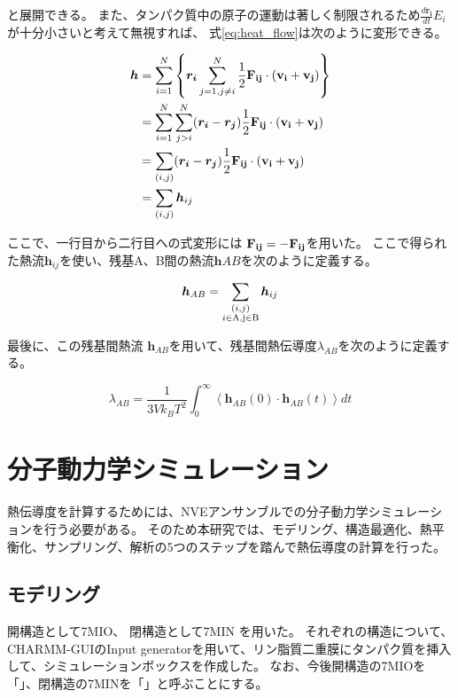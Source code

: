 と展開できる\autocite{leitner_mapping_2018}。
また、タンパク質中の原子の運動は著しく制限されるため$\frac{d\bm{r_i}}{dt}E_{i}$が十分小さいと考えて無視すれば、
式\ref{eq:heat_flow}は次のように変形できる。\autocite{yamatoComputationalStudyThermal2022,oai:nagoya.repo.nii.ac.jp:02007698}

\begin{align}
  \bm{h} &= \sum_{i=1}^{N} \left\{
              \bm{r_i}\sum_{j=1, j \neq i }^{N} \frac{1}{2} \bf{F}_{ij} \cdot (\bf{v}_i + \bf{v}_j)
            \right\} \\
         &= \sum_{i=1}^{N} \sum_{j>i}^{N}
              (\bm{r_i} - \bm{r_j}) \frac{1}{2} \bf{F}_{ij} \cdot (\bf{v}_i + \bf{v}_j) \\
         &= \sum_{(i, j)}
              (\bm{r_i} - \bm{r_j}) \frac{1}{2} \bf{F}_{ij} \cdot (\bf{v}_i + \bf{v}_j) \\
         &= \sum_{(i, j)}
              \bm{h}_{ij}
\end{align}

ここで、一行目から二行目への式変形には $\bf{F}_{ij} = - \bf{F}_{ij}$を用いた。
ここで得られた熱流$\bm{h}_{ij}$を使い、残基A、B間の熱流$\bm{h}{AB}$を次のように定義する。

\begin{equation}
  \label{eq:heat_flow_between_residues}
  \bm{h}_{AB} = \sum_{\substack{(i, j) \\ i \in \rm{A}, j \in \rm{B}}} \bm{h}_{ij}
\end{equation}

最後に、この残基間熱流 $\bm{h}_{AB}$を用いて、残基間熱伝導度$\lambda_{AB}$を次のように定義する。

\begin{equation}
  \label{eq:thermal_conductivity_between_residues}
  \lambda_{AB} = \frac{1}{3Vk_B T^2} \int_{0}^{\infty} \left\langle
    \bm{h}_{AB}(0) \cdot \bm{h}_{AB}(t)
  \right\rangle dt
\end{equation}

\section{分子動力学シミュレーション}

熱伝導度を計算するためには、NVEアンサンブルでの分子動力学シミュレーションを行う必要がある。
そのため本研究では、モデリング、構造最適化、熱平衡化、サンプリング、解析の5つのステップを踏んで熱伝導度の計算を行った。

\subsection{モデリング}
開構造として7MIO、%
閉構造として7MIN  %
を用いた。\autocite{noauthor_7mio_nodate, noauthor_7min_nodate, nadezhdinStructuralMechanismHeatinduced2021}
それぞれの構造について、CHARMM-GUIのInput generator\autocite{jo_charmmgui_2008, lee_charmm-gui_2016}を用いて、リン脂質二重膜にタンパク質を挿入して、シミュレーションボックスを作成した。
なお、今後開構造の7MIOを「\openFortyTwo」、閉構造の7MINを「\closeFortyTwo」と呼ぶことにする。

